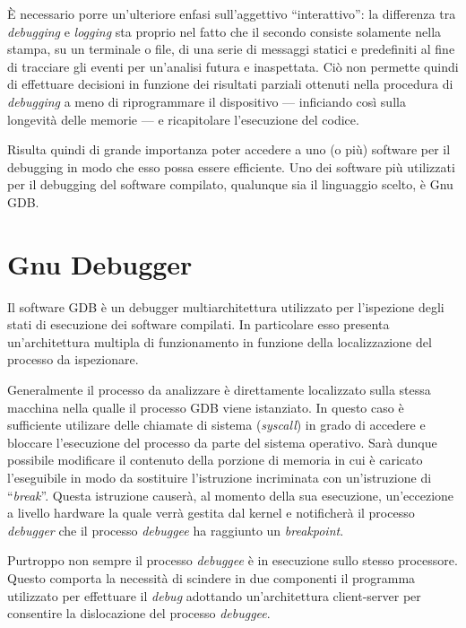 È necessario porre un'ulteriore enfasi sull'aggettivo ``interattivo'': la differenza tra \textit{debugging} e \textit{logging} sta proprio nel fatto che il secondo consiste solamente nella stampa, su un terminale o file, di una serie di messaggi statici e predefiniti al fine di tracciare gli eventi per un'analisi futura e inaspettata. Ciò non permette quindi di effettuare decisioni in funzione dei risultati parziali ottenuti nella procedura di \textit{debugging} a meno di riprogrammare il dispositivo --- inficiando così sulla longevità delle memorie --- e ricapitolare l'esecuzione del codice.

Risulta quindi di grande importanza poter accedere a uno (o più) software per il debugging in modo che esso possa essere efficiente.
Uno dei software più utilizzati per il debugging del software compilato, qualunque sia il linguaggio scelto, è Gnu GDB\cite{site:gdb}.

\section{Gnu Debugger}\label{sec:gdb}

Il software GDB è un debugger multiarchitettura\cite{site:gdb} utilizzato per l'ispezione degli stati di esecuzione dei software compilati.
In particolare esso presenta un'architettura multipla di funzionamento in funzione della localizzazione del processo da ispezionare.

Generalmente il processo da analizzare è direttamente localizzato sulla stessa macchina nella qualle il processo GDB viene istanziato. In questo caso è sufficiente utilizare delle chiamate di sistema (\textit{syscall}) in grado di accedere e bloccare l'esecuzione del processo da parte del sistema operativo.
Sarà dunque possibile modificare il contenuto della porzione di memoria in cui è caricato l'eseguibile in modo da sostituire l'istruzione incriminata con un'istruzione di ``\textit{break}''. Questa istruzione causerà, al momento della sua esecuzione, un'eccezione a livello hardware la quale verrà gestita dal kernel e notificherà il processo \textit{debugger} che il processo \textit{debuggee} ha raggiunto un \textit{breakpoint}.

Purtroppo non sempre il processo \textit{debuggee} è in esecuzione sullo stesso processore. Questo comporta la necessità di scindere in due componenti il programma utilizzato per effettuare il \textit{debug} adottando un'architettura client-server per consentire la dislocazione del processo \textit{debuggee}.

